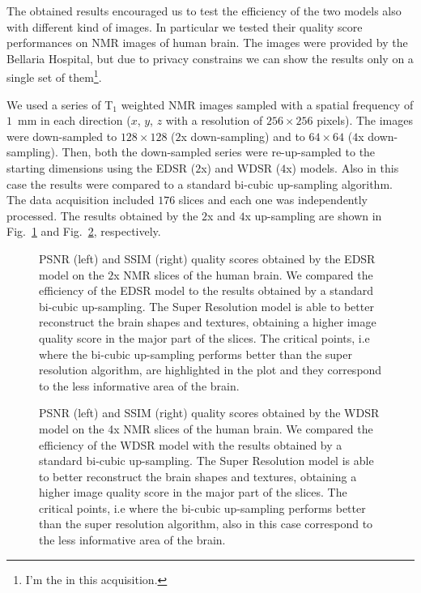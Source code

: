 \documentclass{standalone}
\begin{document}
The obtained results encouraged us to test the efficiency of the two models also with different kind of images.
In particular we tested their quality score performances on NMR images of human brain.
The images were provided by the Bellaria Hospital, but due to privacy constrains we can show the results only on a single set of them\footnote{
  I'm the  in this acquisition.
}.

We used a series of T$_1$ weighted NMR images sampled with a spatial frequency of $1$~mm in each direction ($x$, $y$, $z$ with a resolution of $256\times256$ pixels).
The images were down-sampled to $128\times128$ ($2$x down-sampling) and to $64\times64$ ($4$x down-sampling).
Then, both the down-sampled series were re-up-sampled to the starting dimensions using the EDSR ($2$x) and WDSR ($4$x) models.
Also in this case the results were compared to a standard bi-cubic up-sampling algorithm.
The data acquisition included $176$ slices and each one was independently processed.
The results obtained by the $2$x and $4$x up-sampling are shown in Fig.~\ref{fig:sr_2x} and Fig.~\ref{fig:sr_4x}, respectively.

\begin{figure}[htbp]
\centering
\def\svgwidth{\textwidth}

\caption{PSNR (left) and SSIM (right) quality scores obtained by the EDSR model on the $2$x NMR slices of the human brain.
We compared the efficiency of the EDSR model to the results obtained by a standard bi-cubic up-sampling.
The Super Resolution model is able to better reconstruct the brain shapes and textures, obtaining a higher image quality score in the major part of the slices.
The critical points, i.e where the bi-cubic up-sampling performs better than the super resolution algorithm, are highlighted in the plot and they correspond to the less informative area of the brain.
}
\label{fig:sr_2x}
\end{figure}

\begin{figure}[htbp]
\centering
\def\svgwidth{\textwidth}

\caption{PSNR (left) and SSIM (right) quality scores obtained by the WDSR model on the 4x NMR slices of the human brain.
We compared the efficiency of the WDSR model with the results obtained by a standard bi-cubic up-sampling.
The Super Resolution model is able to better reconstruct the brain shapes and textures, obtaining a higher image quality score in the major part of the slices.
The critical points, i.e where the bi-cubic up-sampling performs better than the super resolution algorithm, also in this case correspond to the less informative area of the brain.
}
\label{fig:sr_4x}
\end{figure}
\end{document}
